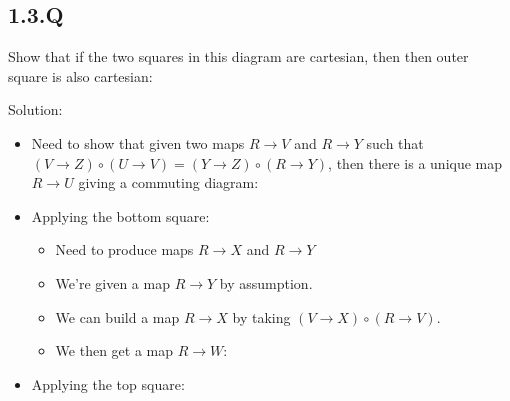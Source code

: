\hypertarget{q}{%
\subsection{1.3.Q}\label{q}}

Show that if the two squares in this diagram are cartesian, then then
outer square is also cartesian:

\begin{center}
\end{center}

Solution:

\begin{itemize}
\tightlist
\item
  Need to show that given two maps \(R\to V\) and \(R\to Y\) such that
  \((V\to Z) \circ (U\to V) = (Y\to Z) \circ (R\to Y)\), then there is a
  unique map \(R\to U\) giving a commuting diagram:

  \begin{center}
  \end{center}
\item
  Applying the bottom square:

  \begin{itemize}
  \tightlist
  \item
    Need to produce maps \(R\to X\) and \(R\to Y\)
  \item
    We're given a map \(R\to Y\) by assumption.
  \item
    We can build a map \(R\to X\) by taking \((V\to X) \circ (R\to V)\).
  \item
    We then get a map \(R\to W\):

    \begin{center}
    \end{center}
  \end{itemize}
\item
  Applying the top square:


\end{itemize}
